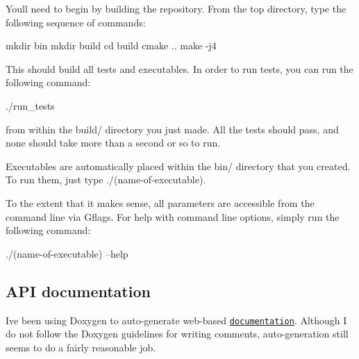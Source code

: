 You\textquotesingle{}ll need to begin by building the repository. From the top directory, type the following sequence of commands\+:


\begin{DoxyCode}
mkdir bin
mkdir build
cd build
cmake ..
make -j4
\end{DoxyCode}


This should build all tests and executables. In order to run tests, you can run the following command\+:


\begin{DoxyCode}
./run\_tests
\end{DoxyCode}


from within the {\ttfamily build/} directory you just made. All the tests should pass, and none should take more than a second or so to run.

Executables are automatically placed within the {\ttfamily bin/} directory that you created. To run them, just type {\ttfamily ./(name-\/of-\/executable)}.

To the extent that it makes sense, all parameters are accessible from the command line via Gflags. For help with command line options, simply run the following command\+:


\begin{DoxyCode}
./(name-of-executable) --help
\end{DoxyCode}


\subsection*{A\+PI documentation}

I\textquotesingle{}ve been using Doxygen to auto-\/generate web-\/based \href{https://dfridovi.github.io/gp/documentation/html/}{\tt documentation}. Although I do not follow the Doxygen guidelines for writing comments, auto-\/generation still seems to do a fairly reasonable job. 